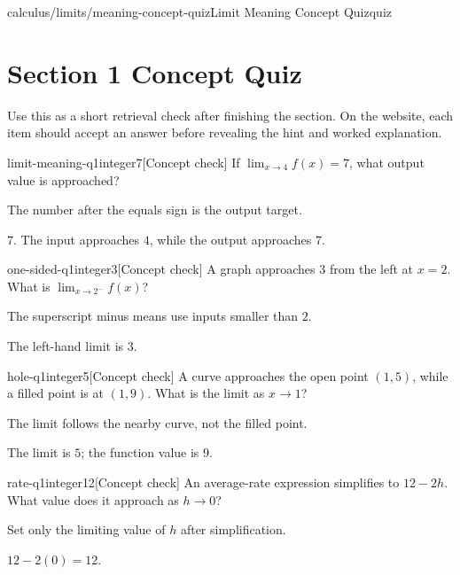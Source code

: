 \documentclass[11pt,openany]{book}
\theoremstyle{bgplain}
\newcounter{bgcheck}[section]
\begin{document}
\begin{webpage}{calculus/limits/meaning-concept-quiz}{Limit Meaning Concept Quiz}{quiz}
\section*{Section 1 Concept Quiz}

Use this as a short retrieval check after finishing the section. On the website, each item should accept an answer before revealing the hint and worked explanation.

\begin{bgcheck}{limit-meaning-q1}{integer}{7}[Concept check]
If \(\lim_{x\to 4}f(x)=7\), what output value is approached?
\begin{bghint}
The number after the equals sign is the output target.
\end{bghint}
\begin{bgreveal}
\(7\). The input approaches \(4\), while the output approaches \(7\).
\end{bgreveal}
\end{bgcheck}

\begin{bgcheck}{one-sided-q1}{integer}{3}[Concept check]
A graph approaches \(3\) from the left at \(x=2\). What is \(\lim_{x\to2^-}f(x)\)?
\begin{bghint}
The superscript minus means use inputs smaller than \(2\).
\end{bghint}
\begin{bgreveal}
The left-hand limit is \(3\).
\end{bgreveal}
\end{bgcheck}

\begin{bgcheck}{hole-q1}{integer}{5}[Concept check]
A curve approaches the open point \((1,5)\), while a filled point is at \((1,9)\). What is the limit as \(x\to1\)?
\begin{bghint}
The limit follows the nearby curve, not the filled point.
\end{bghint}
\begin{bgreveal}
The limit is \(5\); the function value is \(9\).
\end{bgreveal}
\end{bgcheck}

\begin{bgcheck}{rate-q1}{integer}{12}[Concept check]
An average-rate expression simplifies to \(12-2h\). What value does it approach as \(h\to0\)?
\begin{bghint}
Set only the limiting value of \(h\) after simplification.
\end{bghint}
\begin{bgreveal}
\(12-2(0)=12\).
\end{bgreveal}
\end{bgcheck}


\end{webpage}
\end{document}
